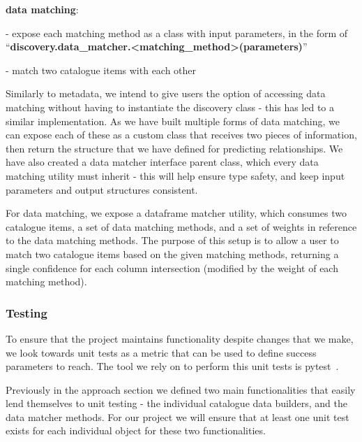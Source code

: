 \bigbreak
\textbf{data matching}:

- expose each matching method as a class with input parameters, in the form of
``\textbf{discovery.data\_matcher.<matching\_method>(parameters)}''

- match two catalogue items with each other

Similarly to metadata, we intend to give users the option of accessing data matching without having to instantiate the
discovery class - this has led to a similar implementation.
As we have built multiple forms of data matching, we can expose each of these as a custom class that receives two pieces
of information, then return the structure that we have defined for predicting relationships.
We have also created a data matcher interface parent class, which every data matching utility must inherit - this will
help ensure type safety, and keep input parameters and output structures consistent.

For data matching, we expose a dataframe matcher utility, which consumes two catalogue items, a set of data matching
methods, and a set of weights in reference to the data matching methods.
The purpose of this setup is to allow a user to match two catalogue items based on the given matching methods, returning
a single confidence for each column intersection (modified by the weight of each matching method).

\subsubsection{Testing}
To ensure that the project maintains functionality despite changes that we make, we look towards unit tests as a metric
that can be used to define success parameters to reach.
The tool we rely on to perform this unit tests is pytest~\cite{PyTest}.

Previously in the approach section we defined two main functionalities that easily lend themselves to unit testing -
the individual catalogue data builders, and the data matcher methods.
For our project we will ensure that at least one unit test exists for each individual object for these two
functionalities.

